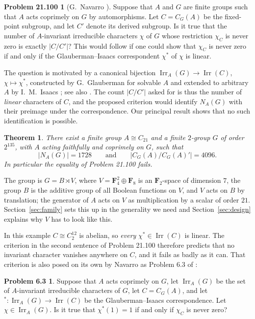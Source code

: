 \documentclass[11pt,a4paper,reqno]{amsart}
\newtheorem{lettertheorem}{Theorem}
\theoremstyle{definition}
\newtheorem*{problem}{Problem 21.100}
\newtheorem*{problem63}{Problem 6.3}
\theoremstyle{remark}
\newcommand{\F}{\mathbf F}
\newcommand{\Irr}{\operatorname{Irr}}
\begin{document}
\begin{problem}[G.~Navarro \cite{kourovka}]
Suppose that $A$ and $G$ are finite groups such that $A$ acts coprimely
on $G$ by automorphisms.  Let $C=C_G(A)$ be the fixed-point subgroup,
and let $C'$ denote its derived subgroup.  Is it true that the number of
$A$-invariant irreducible characters $\chi$ of $G$ whose restriction
$\chi_C$ is never zero is exactly $|C/C'|$?  This would follow if one
could show that $\chi_C$ is never zero if and only if the
Glauberman--Isaacs correspondent $\chi^*$ of $\chi$ is linear.
\end{problem}

The question is motivated by a canonical bijection
$\Irr_A(G)\to\Irr(C)$, $\chi\mapsto\chi^*$, constructed by
G.~Glauberman \cite{glauberman} for solvable $A$ and extended to
arbitrary $A$ by I.~M.~Isaacs \cite{isaacs1973}; see also
\cite[Chapter 2]{navarro-book}.  The count $|C/C'|$ asked for is thus
the number of \emph{linear} characters of $C$, and the proposed
criterion would identify $N_A(G)$ with their preimage under the
correspondence.  Our principal result shows that no such identification
is possible.

\begin{lettertheorem}\label{thm:main}
There exist a finite group $A\cong C_{21}$ and a finite $2$-group
$G$ of order $2^{135}$, with $A$ acting faithfully and coprimely on
$G$, such that
\[
 |N_A(G)|=1728
 \qquad\text{and}\qquad
 |C_G(A)/C_G(A)'|=4096 .
\]
In particular the equality of Problem 21.100 fails.
\end{lettertheorem}

The group is $G=B\rtimes V$, where $V=\F_4^2\oplus\F_8$ is an
$\F_2$-space of dimension $7$, the group $B$ is the additive group of
all Boolean functions on $V$, and $V$ acts on $B$ by translation; the
generator of $A$ acts on $V$ as multiplication by a scalar of order
$21$.  Section~\ref{sec:family} sets this up in the generality we need
and Section~\ref{sec:design} explains why $V$ has to look like this.

In this example $C\cong C_2^{12}$ is abelian, so \emph{every}
$\chi^*\in\Irr(C)$ is linear.  The criterion in the second sentence of
Problem 21.100 therefore predicts that no invariant character vanishes
anywhere on $C$, and it fails as badly as it can.  That criterion is
also posed on its own by Navarro as Problem 6.3 of
\cite{navarro-problems}:

\begin{problem63}\label{prob:63}
Suppose that $A$ acts coprimely on $G$, let $\Irr_A(G)$ be the set of
$A$-invariant irreducible characters of $G$, let $C=C_G(A)$, and let
${}^*\colon\Irr_A(G)\to\Irr(C)$ be the Glauberman--Isaacs
correspondence.  Let $\chi\in\Irr_A(G)$.  Is it true that
$\chi^*(1)=1$ if and only if $\chi_C$ is never zero?
\end{problem63}
\end{document}
